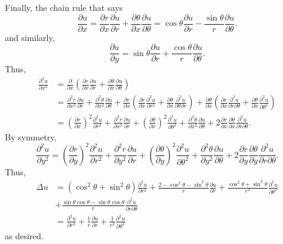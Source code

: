 \documentclass[12 pt, letterpaper]{hmcpset}
\begin{document}
\begin{solution}
	Finally, the chain rule that says
	\[
		\frac{\partial u}{\partial x} = \frac{\partial r}{\partial x} \frac{\partial u}{\partial r} + \frac{\partial \theta}{\partial x} \frac{\partial u}{\partial \theta} = \cos{\theta} \frac{\partial u}{\partial r} - \frac{\sin{\theta}}{r} \frac{\partial u}{\partial \theta}.
	\]
	and similarly,
	\[
		\frac{\partial u}{\partial y} = \sin{\theta} \frac{\partial u}{\partial r} + \frac{\cos{\theta}}{r} \frac{\partial u}{\partial \theta}.
	\]
	Thus,
	\begin{align*}
		\frac{\partial^{2} u}{\partial x^{2}} & = \frac{\partial }{\partial x} \left ( \frac{\partial r}{\partial x} \frac{\partial u}{\partial r} + \frac{\partial \theta}{\partial x} \frac{\partial u}{\partial \theta} \right ) \\
						      & = \frac{\partial^{2} r}{\partial x^{2}} \frac{\partial u}{\partial r} + \frac{\partial^{2} \theta}{\partial x^{2}} \frac{\partial u}{\partial \theta} + \frac{\partial r}{\partial x} \left ( \frac{\partial r}{\partial x} \frac{\partial^{2} u}{\partial r^{2}} + \frac{\partial \theta}{\partial x} \frac{\partial^{2} u}{\partial \theta \partial r} \right ) + \frac{\partial \theta}{\partial x} \left ( \frac{\partial r}{\partial x} \frac{\partial^{2} u}{\partial r \partial \theta} + \frac{\partial \theta}{\partial x} \frac{\partial ^{2} u}{\partial \theta^{2}} \right ) \\
						      & = \left ( \frac{\partial r}{\partial x} \right )^{2} \frac{\partial^{2} u}{\partial r^{2}} + \frac{\partial^{2} r}{\partial x^{2}} \frac{\partial u}{\partial r} + \left ( \frac{\partial \theta}{\partial x} \right )^{2} \frac{\partial^{2} u}{\partial \theta^{2}} + \frac{\partial^{2} \theta}{\partial x^{2}} \frac{\partial u}{\partial \theta} + 2 \frac{\partial r}{\partial x} \frac{\partial \theta}{\partial x} \frac{\partial^{2} u}{\partial r \partial \theta}.
	\end{align*}
	By symmetry,
	\[
		\frac{\partial^{2} u}{\partial y^{2}} = \left ( \frac{\partial r}{\partial y} \right )^{2} \frac{\partial^{2} u}{\partial r^{2}} + \frac{\partial^{2} r}{\partial y^{2}} \frac{\partial u}{\partial r} + \left ( \frac{\partial \theta}{\partial y} \right )^{2} \frac{\partial^{2} u}{\partial \theta^{2}} + \frac{\partial^{2} \theta}{\partial y^{2}} \frac{\partial u}{\partial \theta} + 2 \frac{\partial r}{\partial y} \frac{\partial \theta}{\partial y} \frac{\partial^{2} u}{\partial r \partial \theta}.
	\]
	Thus,
	\begin{align*}
		\Delta u & = (\cos^{2}{\theta} + \sin^{2}{\theta}) \frac{\partial^{2} u}{\partial r^{2}} + \frac{2 - \cos^{2}{\theta} - \sin^{2}{\theta}}{r} \frac{\partial u}{\partial r} + \frac{\cos^{2}{\theta} + \sin^{2}{\theta}}{r^{2}} \frac{\partial^{2} u}{\partial \theta^{2}} \\
			 & + \frac{\sin{\theta} \cos{\theta} - \sin{\theta} \cos{\theta}}{r} \frac{\partial^{2} u}{\partial r \partial \theta} \\
			 & = \frac{\partial^{2} u}{\partial r^{2}} + \frac{1}{r} \frac{\partial u}{\partial r} +  \frac{1}{r^{2}} \frac{\partial^{2} u}{\partial \theta^{2}}
	\end{align*}
	as desired.


\end{solution}
\end{document}
